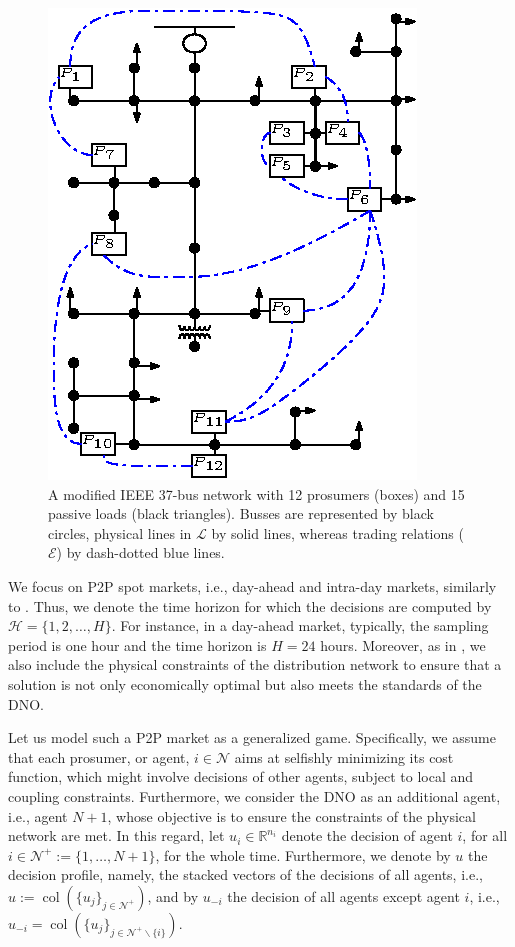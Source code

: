 \documentclass{IEEEtran}  %
\newcommand{\mc}{\mathcal}
\newcommand{\bb}{\mathbb}
\newcommand{\col}{\operatorname{col}}
\newcommand{\0}{\mathbf{0}}
\newcommand{\1}{\mathbf{1}}
\begin{document}
\begin{figure}
	\centering
	\includegraphics[scale=1.4]{figures/37bus_ex}
	\caption{A modified IEEE 37-bus network with 12 prosumers (boxes) and 15 passive loads (black triangles). Busses are represented by black circles, physical lines in $\mc L$ by solid lines, whereas trading relations ($\mc E$) by dash-dotted blue lines.
	}
	\label{fig:GGp}
\end{figure} 
We focus on P2P spot markets, i.e., day-ahead and intra-day markets, similarly to \cite{sousa2019,lecadre2020,moret2020}. Thus, we denote the time horizon for which the decisions are computed by $\mc H = \{1,2,\dots,H \}$. For instance, in a day-ahead market, typically, the sampling period is one hour and the time horizon is $H=24$ hours. Moreover, as in \cite{moret2020}, we also include the physical constraints of the distribution network to ensure that a solution is not only economically optimal but also meets the standards of the DNO.

Let us model such a P2P market as a generalized game. Specifically, we assume that each prosumer, or agent, $i\in \mc N$ aims at selfishly minimizing its cost function, which might involve decisions of other agents, subject to local and coupling constraints. Furthermore, we consider the DNO as an additional agent, i.e., agent $N+1$, whose objective is to ensure the constraints of the physical network are met. 
In this regard, let $u_i \in \bb R^{n_i}$ denote the decision of agent $i$, for all $i\in \mc N^+ :=\{1,\dots,N+1\}$,  for the whole time. 
Furthermore, we denote by $u$ the decision profile, namely, the stacked vectors of the decisions of all agents, i.e., $u:=\col(\{u_j\}_{j\in \mc N^+ })$, and by $u_{-i}$ the decision of all agents except agent $i$, i.e., $u_{-i} = \col(\{u_j\}_{j\in \mc N^+ \backslash \{i\}})$.
\end{document}
